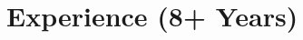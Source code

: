 \documentclass{subfiles}
\begin{document}
\section{Experience (8+ Years)}



% 


% 


% 
\end{document}
